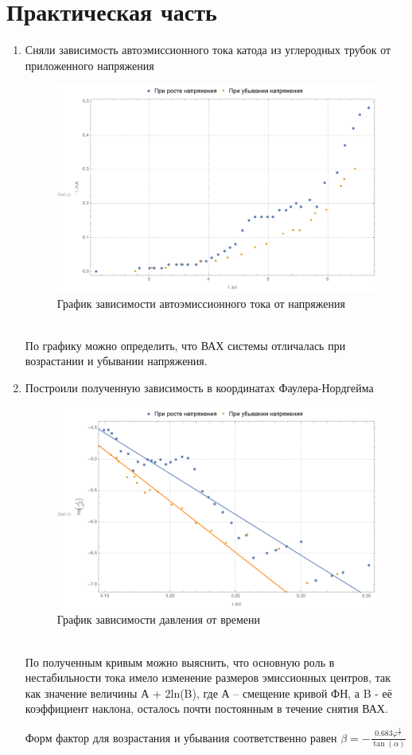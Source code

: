 \documentclass[a4paper, 12pt]{article}
\begin{document}
	\section{Практическая часть}
	\begin{enumerate}
		\item Сняли зависимость автоэмиссионного тока катода из углеродных трубок от приложенного напряжения
		\begin{figure}[!htb]
			\centering
			\includegraphics[scale=0.5]{fig1.pdf}
			\caption{График зависимости автоэмиссионного тока от напряжения}
		\end{figure}
		\\
		По графику можно определить, что ВАХ системы отличалась при возрастании и убывании напряжения.
		\item Построили полученную зависимость в координатах Фаулера-Нордгейма
		\begin{figure}[!htb]
			\centering
			\includegraphics[scale=0.55]{fig2.pdf}
			\caption{График зависимости давления от времени}
		\end{figure}\\
		По полученным кривым можно выяснить, что основную роль в нестабильности тока имело изменение размеров эмиссионных центров, так как значение величины А + 2ln(B), где А – смещение кривой ФН, а B - её коэффициент наклона, осталось почти постоянным в  течение снятия ВАХ.\par
		Форм фактор для возрастания и убывания соответственно равен $\beta=-\frac{0.683\varphi^{\frac{3}{2}}}{\tan(\alpha)}$
	\end{enumerate}
	\newpage
\end{document}

